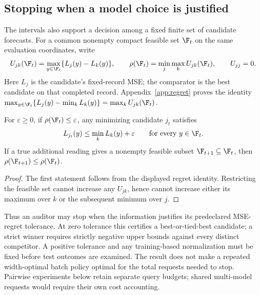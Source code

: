\subsection{Stopping when a model choice is justified}\label{sec:decision-stopping}
The intervals also support a decision among a fixed finite set of candidate
forecasts. For a common nonempty compact feasible set $\F_t$ on the same
evaluation coordinates, write
\[
 U_{jk}(\F_t)=\max_{y\in\F_t}\{L_j(y)-L_k(y)\},\qquad
 \rho(\F_t)=\min_j\max_k U_{jk}(\F_t),\qquad U_{jj}=0.
\]
Here $L_j$ is the candidate's fixed-record MSE; the comparator is the best
candidate on that completed record. Appendix~\ref{app:regret} proves the
identity $\max_{y\in\F_t}\{L_j(y)-\min_kL_k(y)\}=\max_kU_{jk}(\F_t)$.
\begin{corollary}\label{cor:decision-stopping}
For $\varepsilon\geq0$, if $\rho(\F_t)\leq\varepsilon$, any minimizing
candidate $j_t$ satisfies
\[
 L_{j_t}(y)\leq\min_k L_k(y)+\varepsilon\qquad\text{for every }y\in\F_t.
\]
If a true additional reading gives a nonempty feasible subset
$\F_{t+1}\subseteq\F_t$, then $\rho(\F_{t+1})\leq\rho(\F_t)$.
\end{corollary}
\begin{proof}
The first statement follows from the displayed regret identity. Restricting
the feasible set cannot increase any $U_{jk}$, hence cannot increase either
its maximum over $k$ or the subsequent minimum over $j$.
\end{proof}
Thus an auditor may stop when the information justifies its predeclared
MSE-regret tolerance. At zero tolerance this certifies a best-or-tied-best
candidate; a strict winner requires strictly negative upper bounds against
every distinct competitor. A positive tolerance and any training-based
normalization must be fixed before test outcomes are examined. The result
does not make a repeated width-optimal batch policy optimal for the total
requests needed to stop. Pairwise experiments below retain separate query
budgets; shared multi-model requests would require their own cost accounting.
